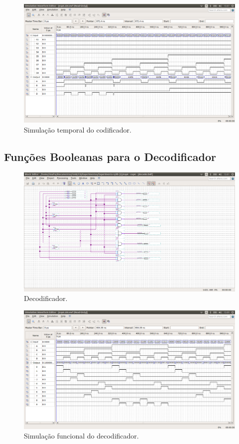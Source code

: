 \documentclass[12pt]{article}
\begin{document}
\begin{figure}[H]
	\centering
	\includegraphics[width=1\textwidth]{timingcoder.png}
	\caption{Simulação temporal do codificador.}
	\label{fig:timecoder}
\end{figure}


\subsection{Funções Booleanas para o Decodificador}
\label{sec:Decod}

\begin{figure}[H]
	\centering
	\includegraphics[width=1\textwidth]{decoder.png}
	\caption{Decodificador.}
	\label{fig:decoder}
\end{figure}

\begin{figure}[H]
	\centering
	\includegraphics[width=1\textwidth]{functionaldecoder.png}
	\caption{Simulação funcional do decodificador.}
	\label{fig:funcdecoder}
\end{figure}
\end{document}
